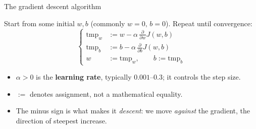 \documentclass[aspectratio=169,10pt]{beamer}
\begin{document}
\begin{frame}{The gradient descent algorithm}
  \begin{defnbox}
    Start from some initial $w,b$ (commonly $w=0,\,b=0$). Repeat until convergence:
    \[
      \left\{
      \begin{aligned}
        \text{tmp}_w &:= w - \alpha\,\frac{\partial}{\partial w}J(w,b)\\[2pt]
        \text{tmp}_b &:= b - \alpha\,\frac{\partial}{\partial b}J(w,b)\\[2pt]
        w &:= \text{tmp}_w,\qquad b := \text{tmp}_b
      \end{aligned}
      \right.
    \]
  \end{defnbox}
  \small
  \begin{itemize}
    \item $\alpha>0$ is the \textbf{learning rate}, typically $0.001$--$0.3$; it
          controls the step size.
    \item $:=$ denotes assignment, not a mathematical equality.
    \item The minus sign is what makes it \emph{descent}: we move \emph{against}
          the gradient, the direction of steepest increase.
  \end{itemize}
\end{frame}
\end{document}
